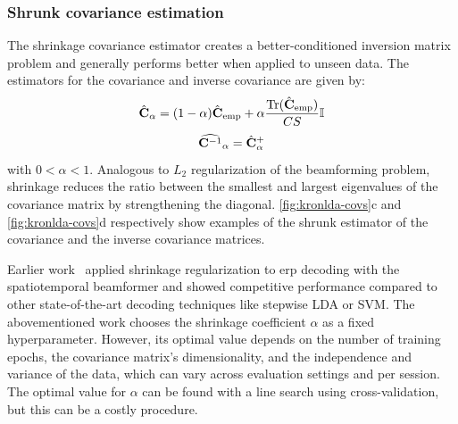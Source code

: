 	\subsubsection{Shrunk covariance estimation}
	\label{sec:stbf-struct/methods/shrunk-cov}
	The shrinkage covariance estimator creates a better-conditioned inversion matrix problem and generally performs better when applied to unseen data.
	The estimators for the covariance and inverse covariance are given by:
	\begin{equation}
    \hat{\mathbf{C}}_\alpha =
    (1-\alpha) \hat{\mathbf{C}}_\text{emp}
    + \alpha\frac{\text{Tr}(\hat{\mathbf{C}}_\text{emp})}{CS}\mathbb{I}
		\label{eq:shrinkage}
	\end{equation}
	\begin{equation}
    \widehat{\mathbf{C}^{-1}}_\alpha =
    \hat{\mathbf{C}}^+_\alpha
		\label{eq:stbf-struct/shrinkage-inv}
	\end{equation}
	with $0<\alpha<1$.
	Analogous to $L_2$ regularization of the beamforming problem,
	shrinkage reduces the ratio between the smallest and largest eigenvalues
	of the covariance matrix by strengthening the diagonal.
	\cref{fig:kronlda-covs}c and \cref{fig:kronlda-covs}d respectively show examples of the
	shrunk estimator of the covariance and the inverse covariance matrices.

	Earlier work~\cite{Libert2021} applied shrinkage regularization to \ac{erp}
	decoding with the spatiotemporal beamformer and showed competitive performance
	compared to other state-of-the-art decoding techniques like stepwise LDA or SVM.
	The abovementioned work chooses the shrinkage coefficient $\alpha$ as a fixed hyperparameter.
	However, its optimal value depends on the number of training epochs, the
	covariance matrix's dimensionality, and the independence and variance of the
	data, which can vary across evaluation settings and per session.
	The optimal value for $\alpha$ can be found with a line search using cross-validation, but this can be a costly procedure.

